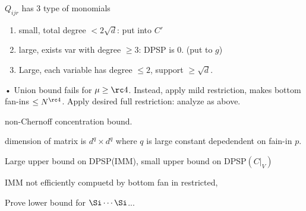 $Q_{ijr}$ has 3 type of monomials
\begin{enumerate}
\item
small, total degree $<2\sqrt d$: put into $C'$
\item
large, exists var with degree $\ge 3$: DPSP is 0. (put to $g$)
\item
Large, each variable has degree $\le2$, support $\ge \sqrt d$.
\end{enumerate}•
Union bound fails for $\mu\ge \rc4$. Instead, apply mild restriction, makes bottom fan-ins $\le N^{\rc 4}$. Apply desired full restriction: analyze as above.

non-Chernoff concentration bound.

dimension of matrix is $d^q\times d^q$ where $q$ is large constant depedendent on fain-in $p$.

Large upper bound on DPSP(IMM), small upper bound on DPSP$(C|_V)$

IMM not efficiently compuetd by bottom fan in restricted,

Prove lower bound for $\Si\cdots \Si $...